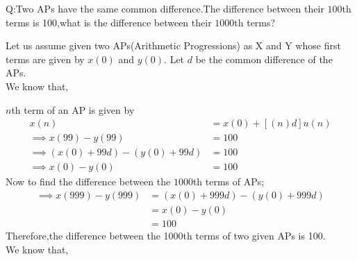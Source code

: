 \documentclass[journal,12pt,onecolumn]{IEEEtran}
\theoremstyle{remark}
\begin{document}
\let\vec\mathbf







\bigskip

\renewcommand{\thefigure}{\theenumi}
\renewcommand{\thetable}{\theenumi}

Q:Two APs have the same common difference.The difference between their $100${th} terms is 100,what is the difference between their $1000${th} terms?

\solution

Let us assume given two APs(Arithmetic Progressions) as X and Y whose first terms are given by $x(0)$ and $y(0)$. Let $d$ be the common difference of the APs. 
\\
We know that, 

$n$th term of an AP is given by 
\begin{align}
x(n) &= x(0)+[(n)d]u(n) \\
\implies x(99) - y(99) &= 100 \\
\implies (x(0) + 99d) - (y(0) + 99d) &= 100
 \\
\implies x(0) - y(0) &= 100
\end{align}
Now to find the difference between the $1000$th terms of APs;
\begin{align}
\implies x(999) - y(999) &= (x(0) + 999d) - (y(0) + 999d)
\\
&= x(0) - y(0)\\
&= 100  
\end{align}
Therefore,the difference between the 1000th terms of two given APs is 100.\\

We know that,
\end{document}
